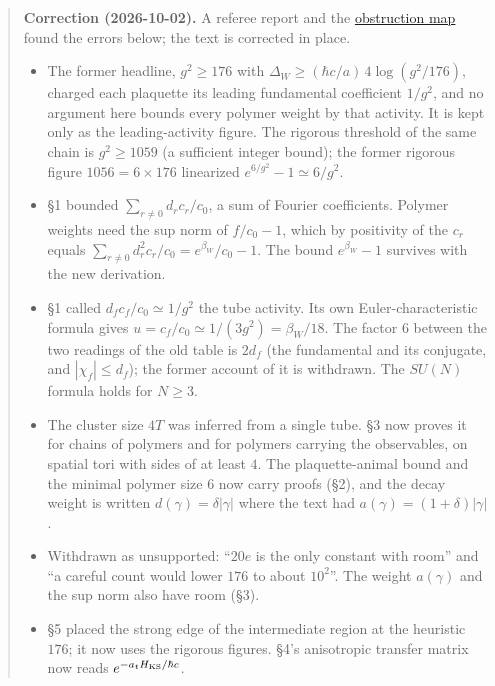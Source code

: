 \documentclass[11pt,a4paper]{article}
\newcommand{\tightlist}{\setlength{\itemsep}{0pt}\setlength{\parskip}{0pt}}
\begin{document}
\begin{quote}
\textbf{Correction (2026-10-02).} A referee report and the
\href{../research/obstructions.md}{obstruction map} found the errors
below; the text is corrected in place.

\begin{itemize}
\tightlist
\item
  The former headline, \(g^2\ge176\) with
  \(\Delta_W\ge(\hbar c/a)\,4\log(g^2/176)\), charged each plaquette its
  leading fundamental coefficient \(1/g^2\), and no argument here bounds
  every polymer weight by that activity. It is kept only as the
  leading-activity figure. The rigorous threshold of the same chain is
  \(g^2\ge1059\) (a sufficient integer bound); the former rigorous
  figure \(1056=6\times176\) linearized \(e^{6/g^2}-1\simeq6/g^2\).
\item
  §1 bounded \(\sum_{r\ne0}d_rc_r/c_0\), a sum of Fourier coefficients.
  Polymer weights need the sup norm of \(f/c_0-1\), which by positivity
  of the \(c_r\) equals \(\sum_{r\ne0}d_r^2c_r/c_0=e^{\beta_W}/c_0-1\).
  The bound \(e^{\beta_W}-1\) survives with the new derivation.
\item
  §1 called \(d_fc_f/c_0\simeq1/g^2\) the tube activity. Its own
  Euler-characteristic formula gives
  \(u=c_f/c_0\simeq1/(3g^2)=\beta_W/18\). The factor \(6\) between the
  two readings of the old table is \(2d_f\) (the fundamental and its
  conjugate, and \(|\chi_f|\le d_f\)); the former account of it is
  withdrawn. The \(SU(N)\) formula holds for \(N\ge3\).
\item
  The cluster size \(4T\) was inferred from a single tube. §3 now proves
  it for chains of polymers and for polymers carrying the observables,
  on spatial tori with sides of at least \(4\). The plaquette-animal
  bound and the minimal polymer size \(6\) now carry proofs (§2), and
  the decay weight is written \(d(\gamma)=\delta|\gamma|\) where the
  text had \(a(\gamma)=(1+\delta)|\gamma|\).
\item
  Withdrawn as unsupported: ``\(20e\) is the only constant with room''
  and ``a careful count would lower \(176\) to about \(10^2\)''. The
  weight \(a(\gamma)\) and the sup norm also have room (§3).
\item
  §5 placed the strong edge of the intermediate region at the heuristic
  \(176\); it now uses the rigorous figures. §4's anisotropic transfer
  matrix now reads \(e^{-a_tH_{\rm KS}/\hbar c}\).
\end{itemize}
\end{quote}
\end{document}
